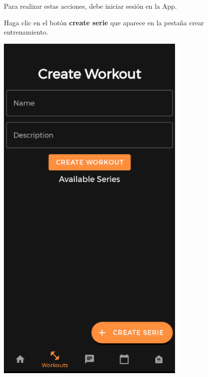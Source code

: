 \documentclass[12pt,a4paper]{article}
\begin{document}
\begin{enumerate}
\item Para realizar estas acciones, debe iniciar sesión en la App.


\begin{minipage}{.60\textwidth}
  \item Haga clic en el botón \textbf{create serie} que aparece en la pestaña crear entrenamiento.
\end{minipage}
\begin{minipage}{.40\textwidth}
  \includegraphics[width=0.7\textwidth, right]{crearworkout}
\end{minipage}



\end{enumerate}
\end{document}
